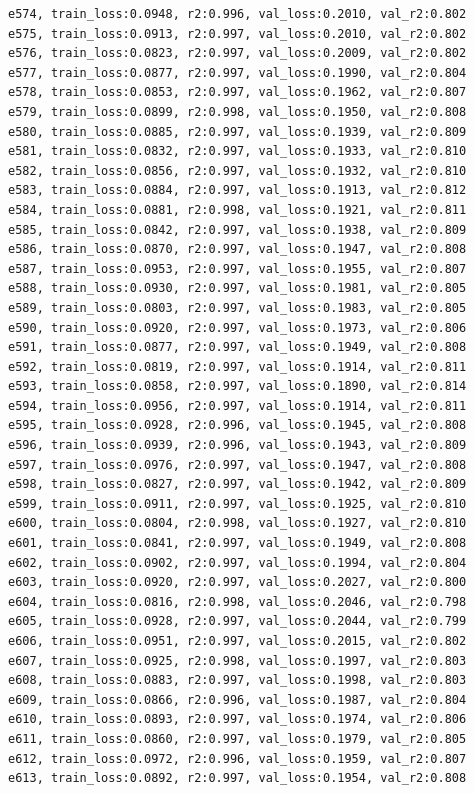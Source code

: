 \documentclass[a4paper, 12pt]{article}
\begin{document}
\begin{lstlisting}
e574, train_loss:0.0948, r2:0.996, val_loss:0.2010, val_r2:0.802
e575, train_loss:0.0913, r2:0.997, val_loss:0.2010, val_r2:0.802
e576, train_loss:0.0823, r2:0.997, val_loss:0.2009, val_r2:0.802
e577, train_loss:0.0877, r2:0.997, val_loss:0.1990, val_r2:0.804
e578, train_loss:0.0853, r2:0.997, val_loss:0.1962, val_r2:0.807
e579, train_loss:0.0899, r2:0.998, val_loss:0.1950, val_r2:0.808
e580, train_loss:0.0885, r2:0.997, val_loss:0.1939, val_r2:0.809
e581, train_loss:0.0832, r2:0.997, val_loss:0.1933, val_r2:0.810
e582, train_loss:0.0856, r2:0.997, val_loss:0.1932, val_r2:0.810
e583, train_loss:0.0884, r2:0.997, val_loss:0.1913, val_r2:0.812
e584, train_loss:0.0881, r2:0.998, val_loss:0.1921, val_r2:0.811
e585, train_loss:0.0842, r2:0.997, val_loss:0.1938, val_r2:0.809
e586, train_loss:0.0870, r2:0.997, val_loss:0.1947, val_r2:0.808
e587, train_loss:0.0953, r2:0.997, val_loss:0.1955, val_r2:0.807
e588, train_loss:0.0930, r2:0.997, val_loss:0.1981, val_r2:0.805
e589, train_loss:0.0803, r2:0.997, val_loss:0.1983, val_r2:0.805
e590, train_loss:0.0920, r2:0.997, val_loss:0.1973, val_r2:0.806
e591, train_loss:0.0877, r2:0.997, val_loss:0.1949, val_r2:0.808
e592, train_loss:0.0819, r2:0.997, val_loss:0.1914, val_r2:0.811
e593, train_loss:0.0858, r2:0.997, val_loss:0.1890, val_r2:0.814
e594, train_loss:0.0956, r2:0.997, val_loss:0.1914, val_r2:0.811
e595, train_loss:0.0928, r2:0.996, val_loss:0.1945, val_r2:0.808
e596, train_loss:0.0939, r2:0.996, val_loss:0.1943, val_r2:0.809
e597, train_loss:0.0976, r2:0.997, val_loss:0.1947, val_r2:0.808
e598, train_loss:0.0827, r2:0.997, val_loss:0.1942, val_r2:0.809
e599, train_loss:0.0911, r2:0.997, val_loss:0.1925, val_r2:0.810
e600, train_loss:0.0804, r2:0.998, val_loss:0.1927, val_r2:0.810
e601, train_loss:0.0841, r2:0.997, val_loss:0.1949, val_r2:0.808
e602, train_loss:0.0902, r2:0.997, val_loss:0.1994, val_r2:0.804
e603, train_loss:0.0920, r2:0.997, val_loss:0.2027, val_r2:0.800
e604, train_loss:0.0816, r2:0.998, val_loss:0.2046, val_r2:0.798
e605, train_loss:0.0928, r2:0.997, val_loss:0.2044, val_r2:0.799
e606, train_loss:0.0951, r2:0.997, val_loss:0.2015, val_r2:0.802
e607, train_loss:0.0925, r2:0.998, val_loss:0.1997, val_r2:0.803
e608, train_loss:0.0883, r2:0.997, val_loss:0.1998, val_r2:0.803
e609, train_loss:0.0866, r2:0.996, val_loss:0.1987, val_r2:0.804
e610, train_loss:0.0893, r2:0.997, val_loss:0.1974, val_r2:0.806
e611, train_loss:0.0860, r2:0.997, val_loss:0.1979, val_r2:0.805
e612, train_loss:0.0972, r2:0.996, val_loss:0.1959, val_r2:0.807
e613, train_loss:0.0892, r2:0.997, val_loss:0.1954, val_r2:0.808

\end{lstlisting}
\end{document}
